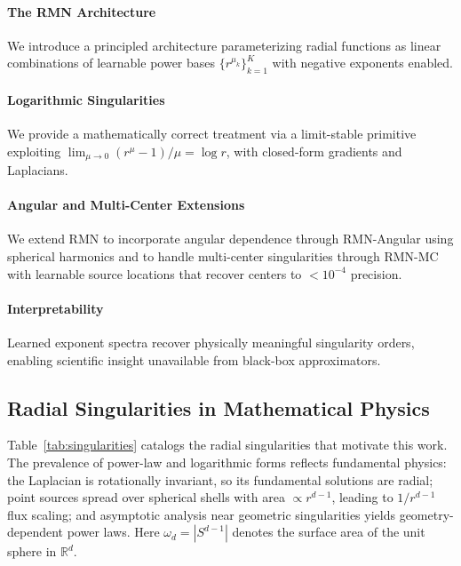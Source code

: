\documentclass[twoside,11pt]{article}
\newcommand{\R}{\mathbb{R}}
\begin{document}
\paragraph{The RMN Architecture} We introduce a principled architecture parameterizing radial functions as linear combinations of learnable power bases $\{r^{\mu_k}\}_{k=1}^K$ with negative exponents enabled.

\paragraph{Logarithmic Singularities} We provide a mathematically correct treatment via a limit-stable primitive exploiting $\lim_{\mu \to 0} (r^\mu - 1)/\mu = \log r$, with closed-form gradients and Laplacians.

\paragraph{Angular and Multi-Center Extensions} We extend RMN to incorporate angular dependence through RMN-Angular using spherical harmonics and to handle multi-center singularities through RMN-MC with learnable source locations that recover centers to $<10^{-4}$ precision.

\paragraph{Interpretability} Learned exponent spectra recover physically meaningful singularity orders, enabling scientific insight unavailable from black-box approximators.

\subsection{Radial Singularities in Mathematical Physics}

Table~\ref{tab:singularities} catalogs the radial singularities that motivate this work. The prevalence of power-law and logarithmic forms reflects fundamental physics: the Laplacian is rotationally invariant, so its fundamental solutions are radial; point sources spread over spherical shells with area $\propto r^{d-1}$, leading to $1/r^{d-1}$ flux scaling; and asymptotic analysis near geometric singularities yields geometry-dependent power laws. Here $\omega_d = |S^{d-1}|$ denotes the surface area of the unit sphere in $\R^d$.
\end{document}
